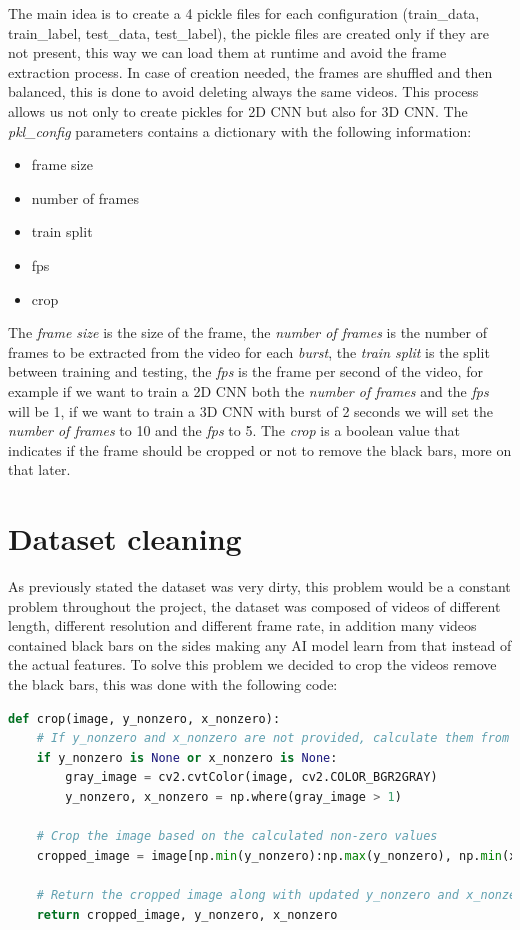 The main idea is to create a 4 pickle files for each configuration (train\_data, train\_label, test\_data, test\_label), the pickle files are created only if they are not present, this way we can load them at runtime and avoid the frame extraction process. In case of creation needed, the frames are shuffled and then balanced, this is done to avoid deleting always the same videos. This process allows us not only to create pickles for 2D CNN but also for 3D CNN. The \textit{pkl\_config} parameters contains a dictionary with the following information:
\begin{itemize}
	\item frame size
	\item number of frames
	\item train split
	\item fps
	\item crop
\end{itemize}
The \textit{frame size} is the size of the frame, the \textit{number of frames} is the number of frames to be extracted from the video for each \textit{burst}, the \textit{train split} is the split between training and testing, the \textit{fps} is the frame per second of the video, for example if we want to train a 2D CNN both the \textit{number of frames} and the \textit{fps} will be 1, if we want to train a 3D CNN with burst of 2 seconds we will set the \textit{number of frames} to 10 and the \textit{fps} to 5. The \textit{crop} is a boolean value that indicates if the frame should be cropped or not to remove the black bars, more on that later.

\section{Dataset cleaning}
As previously stated the dataset was very dirty, this problem would be a constant problem throughout the project, the dataset was composed of videos of different length, different resolution and different frame rate, in addition many videos contained black bars on the sides making any AI model learn from that instead of the actual features. To solve this problem we decided to crop the videos remove the black bars, this was done with the following code:

\begin{lstlisting}[language=Python, caption={Image Cropper}, label={lst:ImageCropper}]
    def crop(image, y_nonzero, x_nonzero):
    # If y_nonzero and x_nonzero are not provided, calculate them from the grayscale version of the image
    if y_nonzero is None or x_nonzero is None:
        gray_image = cv2.cvtColor(image, cv2.COLOR_BGR2GRAY)
        y_nonzero, x_nonzero = np.where(gray_image > 1)

    # Crop the image based on the calculated non-zero values
    cropped_image = image[np.min(y_nonzero):np.max(y_nonzero), np.min(x_nonzero):np.max(x_nonzero)]

    # Return the cropped image along with updated y_nonzero and x_nonzero values
    return cropped_image, y_nonzero, x_nonzero
\end{lstlisting}


